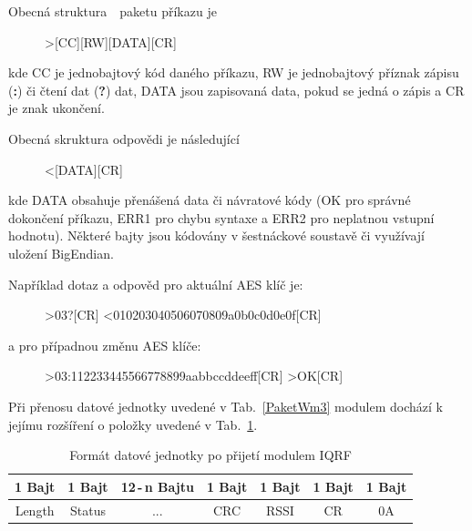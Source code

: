 \newpage
Obecná struktura~\cite{ModulIQRF}~paketu příkazu je 

\begin{figure}[!ht]
\begin{centerverbatim}
			>[CC][RW][DATA][CR]
\end{centerverbatim}
\end{figure}

kde CC je jednobajtový kód daného příkazu, RW je jednobajtový příznak zápisu (\textbf{:}) či čtení dat (\textbf{?}) dat, DATA jsou zapisovaná data, pokud se jedná o zápis a CR je znak ukončení.

Obecná skruktura odpovědi je následující

\begin{figure}[!ht]
\begin{centerverbatim}
	<[DATA][CR]
\end{centerverbatim}
\end{figure}

kde DATA obsahuje přenášená data či návratové kódy (OK pro správné dokončení příkazu, ERR1 pro chybu syntaxe a ERR2 pro neplatnou vstupní hodnotu). Některé bajty jsou kódovány v šestnáckové soustavě či využívají uložení BigEndian.

Například dotaz a odpověd pro aktuální AES klíč je:

\begin{figure}[!ht]
\begin{centerverbatim}
	>03?[CR]
	<010203040506070809a0b0c0d0e0f[CR]  
\end{centerverbatim}
\end{figure}

a pro případnou změnu AES klíče:

\begin{figure}[!ht]
\begin{centerverbatim}
>03:112233445566778899aabbccddeeff[CR]
>OK[CR]
\end{centerverbatim}
\end{figure}

Při přenosu datové jednotky uvedené v Tab.~\ref{PaketWm3} modulem dochází k jejímu rozšíření o položky uvedené v Tab.~\ref{PaketWm4}.

\begin{table}[!h]
\centering
\begin{tabular}{ccccccc}
1 Bajt & 1 Bajt & 12\,-\,n Bajtu & 1 Bajt & 1 Bajt & 1 Bajt & 1 Bajt\\ \hline
\multicolumn{1}{|c|}{Length} & \multicolumn{1}{c|}{Status} & \multicolumn{1}{c|}{...} & \multicolumn{1}{c|}{CRC} & \multicolumn{1}{c|}{RSSI} & \multicolumn{1}{c|}{CR} & \multicolumn{1}{c|}{0A}\\ \hline
\end{tabular}
\caption{Formát datové jednotky po přijetí modulem IQRF}
\label{PaketWm4}
\end{table}





